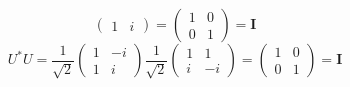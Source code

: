 \documentclass[12pt]{article}
\begin{document}
\begin{enumerate}[font=\bfseries]
\begin{enumerate}
\[\begin{pmatrix}
                        1 & i
                        \end{pmatrix}
                        =
                        \begin{pmatrix}
                        1 & 0 \\
                        0 & 1
                        \end{pmatrix}
                        = \mathbf{I}
                        \]
                \[U^*U = \frac{1}{\sqrt{2}}\begin{pmatrix}
                        1 & -i \\
                        1 & i
                        \end{pmatrix}
                        \frac{1}{\sqrt{2}}\begin{pmatrix}
                        1 & 1 \\
                        i & -i
                        \end{pmatrix}
                        =
                        \begin{pmatrix}
                        1 & 0 \\
                        0 & 1
                        \end{pmatrix}
                        = \mathbf{I}
                        \]
                

\end{enumerate}
\end{enumerate}
\end{document}
